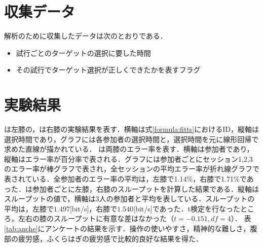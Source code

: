 \section{収集データ}
解析のために収集したデータは次のとおりである．
\begin{itemize}
	\item 試行ごとのターゲットの選択に要した時間
	\item その試行でターゲット選択が正しくできたかを表すフラグ
\end{itemize}


\section{実験結果}
は左膝の，は右膝の実験結果を表す．横軸は式\ref{formula:fitts}におけるID，縦軸は選択時間であり，グラフには各参加者の選択時間と，選択時間を元に線形回帰で求めた直線が描かれている．
は両膝のエラー率を表す．横軸は参加者であり，縦軸はエラー率が百分率で表される．グラフには参加者ごとにセッション1,2,3のエラー率が棒グラフで表され，全セッションの平均エラー率が折れ線グラフで表されている．全参加者のエラー率の平均は，左膝で1.14\%，右膝で1.71\%であった．は参加者ごとに左膝，右膝のスループットを計算した結果である．縦軸はスループットの値で，横軸は3人の参加者と平均を表している．スループットの平均は，左膝で$1.497$[bit/s]，右膝で$1.540$[bit/s]であった．t検定を行なったところ，左右の膝のスループットに有意な差はなかった（$t=-0.151, df=4$）．
表\ref{tab:anche}にアンケートの結果を示す．操作の使いやすさ，精神的な難しさ，腹部の疲労感，ふくらはぎの疲労感で比較的良好な結果を得た．
